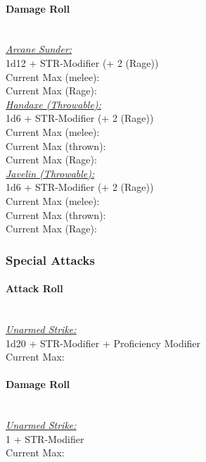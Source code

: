 \documentclass[letterpaper,openany,oneside,twocolumn]{book}
\begin{document}
\paragraph*{Damage Roll}\hfill\\
\underline{\textit{Arcane Sunder:}}\\
1d12 + STR-Modifier (+ 2 (Rage))\\
\indent Current Max (melee): \\
\indent Current Max (Rage): \\
\underline{\textit{Handaxe (Throwable):}}\\
1d6 + STR-Modifier (+ 2 (Rage))\\
\indent Current Max (melee): \\
\indent Current Max (thrown): \\
\indent Current Max (Rage): \\
\underline{\textit{Javelin (Throwable):}}\\
1d6 + STR-Modifier (+ 2 (Rage))\\
\indent Current Max (melee): \\
\indent Current Max (thrown): \\
\indent Current Max (Rage): 
\subsubsection*{Special Attacks}
\paragraph*{Attack Roll}\hfill\\
\underline{\textit{Unarmed Strike:}}\\
1d20 + STR-Modifier + Proficiency Modifier\\
\indent Current Max: 
\paragraph*{Damage Roll}\hfill\\
\underline{\textit{Unarmed Strike:}}\\
1 + STR-Modifier\\
\indent Current Max: 
\end{document}
